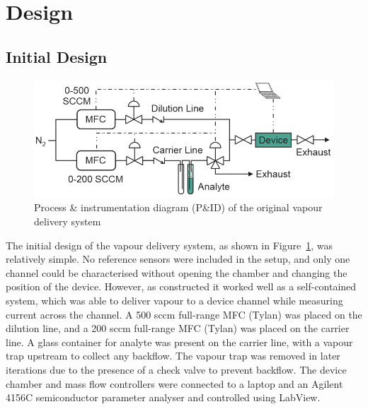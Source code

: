 \documentclass[
  a4paper,
]{scrbook}
\begin{document}
\hypertarget{sec-vapour-system-design}{%
\section{Design}\label{sec-vapour-system-design}}

\hypertarget{initial-design}{%
\subsection{Initial Design}\label{initial-design}}

\begin{figure}

{\centering \includegraphics[width=1\textwidth,height=\textheight]{figures/ch8/PID_V0.png}

}

\caption[P\&ID of the original vapour delivery
system.]{\label{fig-original-pid}Process \& instrumentation diagram
(P\&ID) of the original vapour delivery system}

\end{figure}

The initial design of the vapour delivery system, as shown in
Figure~\ref{fig-original-pid}, was relatively simple. No reference
sensors were included in the setup, and only one channel could be
characterised without opening the chamber and changing the position of
the device. However, as constructed it worked well as a self-contained
system, which was able to deliver vapour to a device channel while
measuring current across the channel. A 500 sccm full-range MFC (Tylan)
was placed on the dilution line, and a 200 sccm full-range MFC (Tylan)
was placed on the carrier line. A glass container for analyte was
present on the carrier line, with a vapour trap upstream to collect any
backflow. The vapour trap was removed in later iterations due to the
presence of a check valve to prevent backflow. The device chamber and
mass flow controllers were connected to a laptop and an Agilent 4156C
semiconductor parameter analyser and controlled using LabView.
\end{document}
